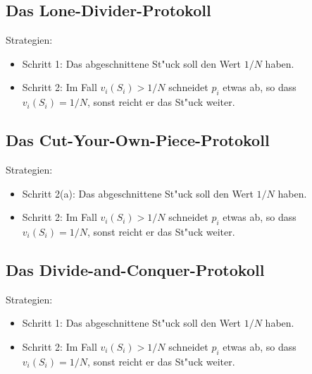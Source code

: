 \documentclass[11pt, a4paper, twoside]{article}
\numberwithin{equation}{section}
\begin{document}
\subsection{Das Lone-Divider-Protokoll}
%
%
%
%
Strategien:\\
\begin{itemize}
\item Schritt 1: Das abgeschnittene St"uck soll den Wert $1/N$ haben.
\item Schritt 2: Im Fall $v_i(S_i)>1/N$ schneidet $p_i$ etwas ab, so dass $v_i(S_i)=1/N$, sonst reicht er das St"uck weiter.
\end{itemize}

\subsection{Das Cut-Your-Own-Piece-Protokoll}
%
Strategien:\\
\begin{itemize}
\item Schritt 2(a): Das abgeschnittene St"uck soll den Wert $1/N$ haben.
\item Schritt 2: Im Fall $v_i(S_i)>1/N$ schneidet $p_i$ etwas ab, so dass $v_i(S_i)=1/N$, sonst reicht er das St"uck weiter.
\end{itemize}


\subsection{Das Divide-and-Conquer-Protokoll}
%
%
Strategien:\\
\begin{itemize}
\item Schritt 1: Das abgeschnittene St"uck soll den Wert $1/N$ haben.
\item Schritt 2: Im Fall $v_i(S_i)>1/N$ schneidet $p_i$ etwas ab, so dass $v_i(S_i)=1/N$, sonst reicht er das St"uck weiter.
\end{itemize}
\end{document}
